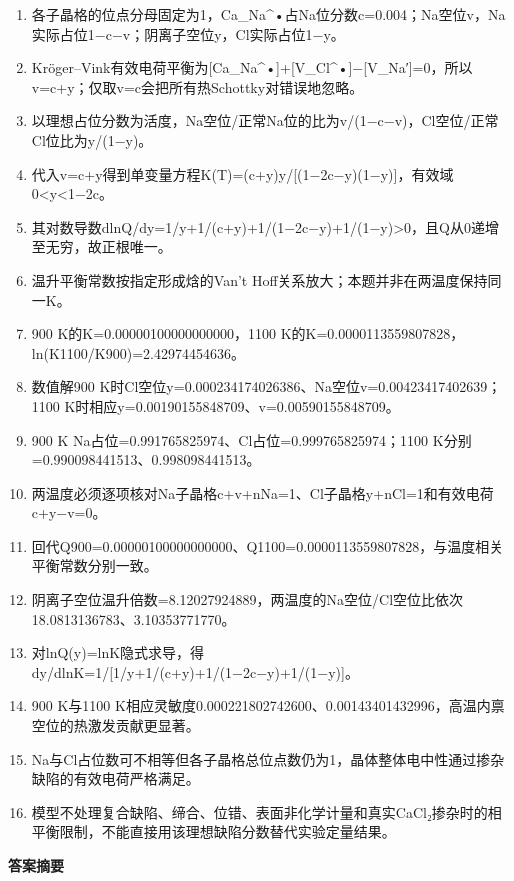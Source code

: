 \documentclass[UTF8,11pt,a4paper]{ctexart}
\begin{document}
\begin{enumerate}
\item 各子晶格的位点分母固定为1，Ca\_Na\textasciicircum{}•占Na位分数c=0.004；Na空位v，Na实际占位1−c−v；阴离子空位y，Cl实际占位1−y。
\item Kröger–Vink有效电荷平衡为[Ca\_Na\textasciicircum{}•]+[V\_Cl\textasciicircum{}•]−[V\_Na′]=0，所以v=c+y；仅取v=c会把所有热Schottky对错误地忽略。
\item 以理想占位分数为活度，Na空位/正常Na位的比为v/(1−c−v)，Cl空位/正常Cl位比为y/(1−y)。
\item 代入v=c+y得到单变量方程K(T)=(c+y)y/[(1−2c−y)(1−y)]，有效域0<y<1−2c。
\item 其对数导数dlnQ/dy=1/y+1/(c+y)+1/(1−2c−y)+1/(1−y)>0，且Q从0递增至无穷，故正根唯一。
\item 温升平衡常数按指定形成焓的Van’t Hoff关系放大；本题并非在两温度保持同一K。
\item 900 K的K=0.00000100000000000，1100 K的K=0.0000113559807828，ln(K1100/K900)=2.42974454636。
\item 数值解900 K时Cl空位y=0.000234174026386、Na空位v=0.00423417402639；1100 K时相应y=0.00190155848709、v=0.00590155848709。
\item 900 K Na占位=0.991765825974、Cl占位=0.999765825974；1100 K分别=0.990098441513、0.998098441513。
\item 两温度必须逐项核对Na子晶格c+v+nNa=1、Cl子晶格y+nCl=1和有效电荷c+y−v=0。
\item 回代Q900=0.00000100000000000、Q1100=0.0000113559807828，与温度相关平衡常数分别一致。
\item 阴离子空位温升倍数=8.12027924889，两温度的Na空位/Cl空位比依次18.0813136783、3.10353771770。
\item 对lnQ(y)=lnK隐式求导，得dy/dlnK=1/[1/y+1/(c+y)+1/(1−2c−y)+1/(1−y)]。
\item 900 K与1100 K相应灵敏度0.000221802742600、0.00143401432996，高温内禀空位的热激发贡献更显著。
\item Na与Cl占位数可不相等但各子晶格总位点数仍为1，晶体整体电中性通过掺杂缺陷的有效电荷严格满足。
\item 模型不处理复合缺陷、缔合、位错、表面非化学计量和真实CaCl₂掺杂时的相平衡限制，不能直接用该理想缺陷分数替代实验定量结果。
\end{enumerate}
\noindent\textbf{答案摘要}\par
\end{document}
